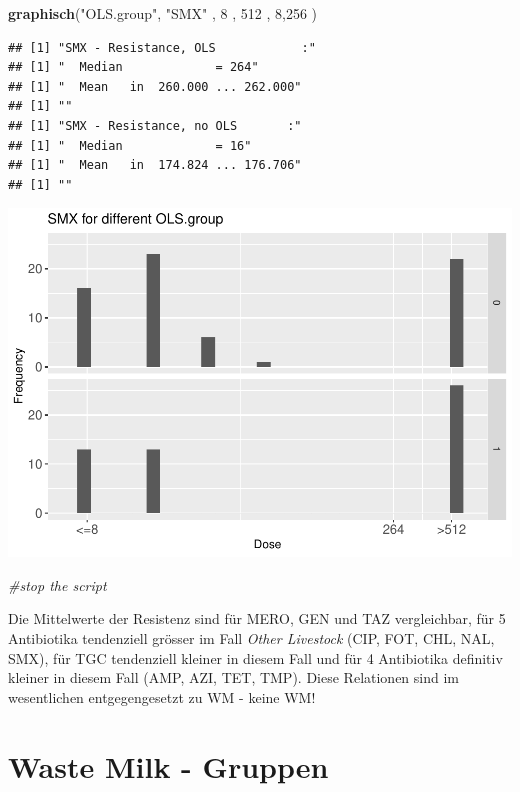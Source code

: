 \documentclass[
]{article}
\newenvironment{Shaded}{\begin{snugshade}}{\end{snugshade}}
\newcommand{\CommentTok}[1]{\textcolor[rgb]{0.56,0.35,0.01}{\textit{#1}}}
\newcommand{\DecValTok}[1]{\textcolor[rgb]{0.00,0.00,0.81}{#1}}
\newcommand{\KeywordTok}[1]{\textcolor[rgb]{0.13,0.29,0.53}{\textbf{#1}}}
\newcommand{\NormalTok}[1]{#1}
\newcommand{\StringTok}[1]{\textcolor[rgb]{0.31,0.60,0.02}{#1}}
\begin{document}
\begin{Shaded}
\begin{Highlighting}[]
  \KeywordTok{graphisch}\NormalTok{(}\StringTok{"OLS.group"}\NormalTok{, }\StringTok{"SMX"}\NormalTok{ , }\DecValTok{8}\NormalTok{    , }\DecValTok{512}\NormalTok{   ,   }\DecValTok{8}\NormalTok{,}\DecValTok{256}\NormalTok{   ) }
\end{Highlighting}
\end{Shaded}

\begin{verbatim}
## [1] "SMX - Resistance, OLS            :"
## [1] "  Median             = 264"
## [1] "  Mean   in  260.000 ... 262.000"
## [1] ""
## [1] "SMX - Resistance, no OLS       :"
## [1] "  Median             = 16"
## [1] "  Mean   in  174.824 ... 176.706"
## [1] ""
\end{verbatim}

\includegraphics{Verteilungen_files/figure-latex/unnamed-chunk-30-1.pdf}

\begin{Shaded}
\begin{Highlighting}[]
  \CommentTok{#stop the script}
\end{Highlighting}
\end{Shaded}

Die Mittelwerte der Resistenz sind für MERO, GEN und TAZ vergleichbar,
für 5 Antibiotika tendenziell grösser im Fall \emph{Other Livestock}
(CIP, FOT, CHL, NAL, SMX), für TGC tendenziell kleiner in diesem Fall
und für 4 Antibiotika definitiv kleiner in diesem Fall (AMP, AZI, TET,
TMP). Diese Relationen sind im wesentlichen entgegengesetzt zu WM -
keine WM!

\hypertarget{waste-milk---gruppen}{%
\section{Waste Milk - Gruppen}\label{waste-milk---gruppen}}
\end{document}
